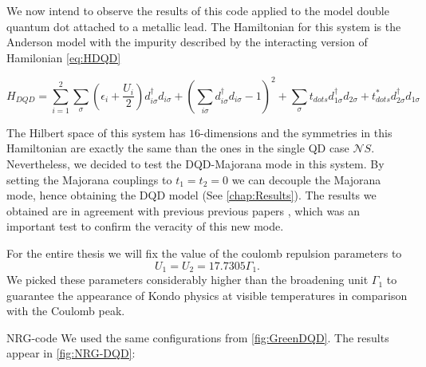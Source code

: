 We now intend to observe the results of this code applied to the model double quantum dot attached to a metallic lead. The  Hamiltonian for this system is the Anderson model with the impurity described by the interacting version of Hamilonian \eqref{eq:HDQD}

\begin{equation}
H_{DQD}=\sum_{i=1}^2\sum_\sigma \left( \epsilon_{i} + \frac{U_i}{2} \right) d_{i\sigma}^{\dagger}d_{i\sigma} + \left(\sum_{i\sigma} d_{i\sigma}^{\dagger}d_{i\sigma} -1 \right)^2 + \sum_\sigma t_{dots}d_{1\sigma}^{\dagger}d_{2\sigma}+t_{dots}^*d_{2\sigma}^{\dagger}d_{1\sigma}
\label{eq:interactingDQD}
\end{equation}

\noindent The Hilbert space of this system has $16$-dimensions and the symmetries in this Hamiltonian are exactly the same than the ones in the single QD case $\mathcal{N}S$. Nevertheless, we decided to test the DQD-Majorana mode in this system. By setting the Majorana couplings to $t_1=t_2= 0$ we can decouple the Majorana mode, hence obtaining the DQD model (See \ref{chap:Results}). The results we obtained are in agreement with previous previous papers \cite{dias_da_silva_transmission_2008}, which was an important test to confirm the veracity of this new mode. 

For the entire thesis we will fix the value of the coulomb repulsion parameters to 
\begin{equation}
 U_1 = U_2 = 17.7305 \Gamma_1.
\end{equation}
\noindent We picked these parameters considerably higher than the broadening unit $\Gamma_1$ to guarantee the appearance of Kondo physics at visible temperatures in comparison with the Coulomb peak.  




 NRG-code  We used the same configurations from \ref{fig:GreenDQD}. The  results appear in \ref{fig:NRG-DQD}:

